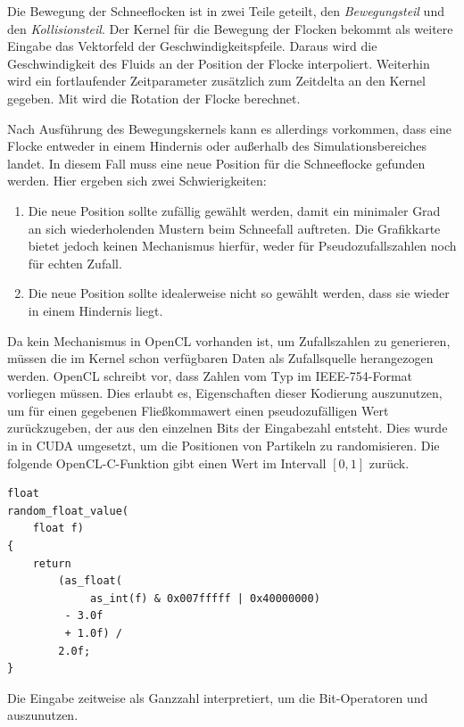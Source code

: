 Die Bewegung der Schneeflocken ist in zwei Teile geteilt, den
\emph{Bewegungsteil} und den \emph{Kollisionsteil}. Der Kernel für die
Bewegung der Flocken bekommt als weitere Eingabe das Vektorfeld der
Geschwindigkeitspfeile. Daraus wird die Geschwindigkeit des Fluids an
der Position der Flocke interpoliert. Weiterhin wird ein fortlaufender
Zeitparameter  zusätzlich zum Zeitdelta
 an den Kernel gegeben. Mit
 wird die Rotation der Flocke berechnet.

Nach Ausführung des Bewegungskernels kann es allerdings vorkommen,
dass eine Flocke entweder in einem Hindernis oder außerhalb des
Simulationsbereiches landet. In diesem Fall muss eine neue Position
für die Schneeflocke gefunden werden. Hier ergeben sich zwei
Schwierigkeiten:

\begin{enumerate}
\item Die neue Position sollte zufällig gewählt werden, damit ein
minimaler Grad an sich wiederholenden Mustern beim Schneefall
auftreten. Die Grafikkarte bietet jedoch keinen Mechanismus hierfür,
weder für Pseudozufallszahlen noch für echten Zufall.
\item Die neue Position sollte idealerweise nicht so gewählt werden,
dass sie wieder in einem Hindernis liegt.
\end{enumerate}

Da kein Mechanismus in OpenCL vorhanden ist, um Zufallszahlen zu
generieren, müssen die im Kernel schon verfügbaren Daten als
Zufallsquelle herangezogen werden. OpenCL schreibt vor, dass Zahlen
vom Typ  im IEEE-754-Format vorliegen
müssen. Dies erlaubt es, Eigenschaften dieser Kodierung auszunutzen,
um für einen gegebenen Fließkommawert einen pseudozufälligen Wert
zurückzugeben, der aus den einzelnen Bits der Eingabezahl
entsteht. Dies wurde in \cite{Eidissen2009} in CUDA umgesetzt, um die
Positionen von Partikeln zu randomisieren. Die folgende
OpenCL-C-Funktion gibt einen Wert im Intervall $[0,1]$ zurück.

\begin{verbatim}
float
random_float_value(
    float f)
{
    return
        (as_float(
             as_int(f) & 0x007fffff | 0x40000000)
         - 3.0f
         + 1.0f) /
        2.0f;
}
\end{verbatim}

Die Eingabe  zeitweise als Ganzzahl interpretiert, um
die Bit-Operatoren \PimiddyInlineCode{\&} und \PimiddyInlineCode{|}
auszunutzen.

